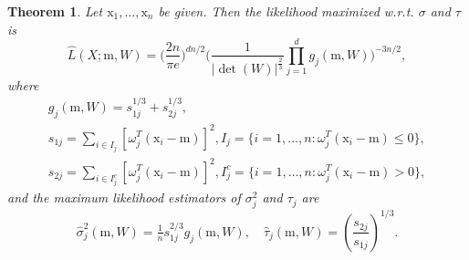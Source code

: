 \documentclass[12pt]{article}
\def\w{\omega}
\def\x{\mathrm{x}}
\def\m{\mathrm{m}}
\newtheorem{theorem}{Theorem}[section]
\theoremstyle{definition}
\def\w{\omega}
\begin{document}
\begin{theorem}\label{the:min}
Let $\x_1,\ldots,\x_n$ be given.  
Then the likelihood maximized w.r.t. $\sigma$ and $\tau$ is
\begin{equation}\label{eq:1}
 \hat{L}(X;\m,W) =   \bigg( \frac{2n}{\pi e} \bigg)^{dn/2} \bigg( \frac{1}{|\det(W)|^{\frac{2}{3}}} \prod_{j=1}^{d} g_{j}(\m,W) \bigg)^{-3n/2},
\end{equation}
where
$$
\begin{array}{c}
{g}_{j}(\m,W) = {s}_{1j}^{1/3} + {s}_{2j}^{1/3},
\\[1ex]
{s}_{1j}= \! \sum\limits_{i \in I_j}[ \w_{j}^T (\x_i-\m)]^2,  {I}_j=\{ i = 1,\ldots,n \colon \w_{j}^T (\x_i-\m) \leq 0 \},
\\[1ex]
{s}_{2j}= \! \sum\limits_{i \in I_j^c}[ \w_{j}^T (\x_i-\m)]^2, {I}_j^c=\{ i = 1,\ldots,n \colon  \w_{j}^T (\x_i-\m) > 0 \},
\end{array}
$$
and the maximum likelihood estimators of $\sigma_{j}^2$ and $\tau_{j}$ are
$$\hat \sigma_j^2(\m,W) = \tfrac{1}{n} s_{1j}^{2/3} g_{j}(\m,W), \quad
\hat \tau_{j}(\m,W)=\left(\frac{s_{2j}}{s_{1j}}\right)^{1/3}.
$$
\end{theorem}
\end{document}
